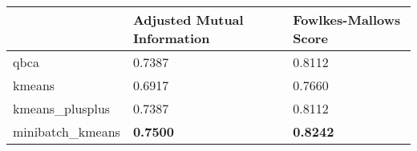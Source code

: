 \begin{table}[htbp]
\centering
\begin{tabular}{lll}
\toprule
 & Adjusted Mutual Information & Fowlkes-Mallows Score \\
\midrule
qbca & 0.7387 & 0.8112 \\
kmeans & 0.6917 & 0.7660 \\
kmeans_plusplus & 0.7387 & 0.8112 \\
minibatch_kmeans & \textbf{0.7500} & \textbf{0.8242} \\
\bottomrule
\end{tabular}
\end{table}
